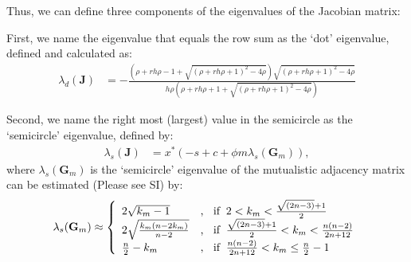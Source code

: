 \documentclass[a4paper,fleqn,12pt]{article}
\begin{document}
Thus, we can define three components of the eigenvalues of the Jacobian matrix:

First, we name the eigenvalue that equals the row sum as the `dot' eigenvalue, defined and calculated as:
\begin{align} \label{eq:nonstructural-dot-definition}
\lambda_d(\mathbf{J}) 
&= -\frac{(\rho + rh\rho - 1 + \sqrt{(\rho+rh\rho+1)^2-4\rho})\sqrt{(\rho+rh\rho+1)^2-4\rho}}{h\rho(\rho + rh\rho + 1 + \sqrt{(\rho+rh\rho+1)^2-4\rho})}
\end{align}

Second, we name the right most (largest) value in the semicircle as the `semicircle' eigenvalue, defined by:
\begin{align} \label{eq:nonstructural-semicircle-definition}
\lambda_s(\mathbf{J}) 
&= x^*(-s + c + \phi m\lambda_s(\mathbf{G}_m)),
\end{align}
where
$\lambda_s(\mathbf{G}_m)$ is the `semicircle' eigenvalue of the mutualistic adjacency matrix can be estimated (Please see SI) by:
\begin{equation} \label{eq:bipartite-est}
\lambda_s(\mathbf{G}_m) \approx \left\{
\begin{array}{ll}
2\sqrt{k_m-1} & \textrm{, \;\;if\;\;} 2 < k_m < \frac{\sqrt{(2n-3)}+1}{2} \\
2\sqrt{\frac{k_m(n - 2k_m)}{n-2}} & \textrm{, \;\;if\;\;} \frac{\sqrt{(2n-3)}+1}{2} < k_m < \frac{n(n-2)}{2n+12} \\
\frac{n}{2} - k_m & \textrm{, \;\;if\;\;} \frac{n(n-2)}{2n+12} < k_m \le \frac{n}{2}-1 
\end{array}
\right.
\end{equation}
\end{document}
